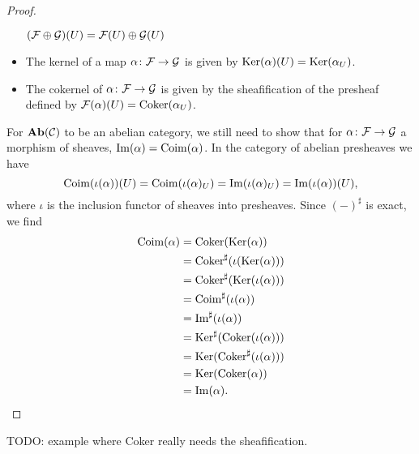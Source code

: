 \documentclass{article}
\begin{document}
\begin{proof}
\begin{itemize}
              $(\mathcal{F} \oplus \mathcal{G} )(U) = \mathcal{F}(U) \oplus \mathcal{G}(U)$
        \item The kernel of a map $\alpha \colon \mathcal{F} \to \mathcal{G}$ is given by
              $\operatorname{Ker}(\alpha)(U) = \operatorname{Ker}(\alpha_U)$.
        \item The cokernel of $\alpha \colon \mathcal{F} \to \mathcal{G}$
              is given by the sheafification of the presheaf defined by
              $\mathcal{F}(\alpha)(U) = \operatorname{Coker}(\alpha_U)$.
    \end{itemize}
    For $\operatorname{\mathbf{Ab}}(\mathcal{C})$ to be an abelian category, we still need to
    show that for $\alpha \colon \mathcal{F} \to \mathcal{G}$ a morphism of sheaves,
    $\operatorname{Im}(\alpha) = \operatorname{Coim}(\alpha)$. In the category of abelian presheaves we have
    \begin{equation*}
        \operatorname{Coim}(\iota(\alpha))(U) = \operatorname{Coim}(\iota(\alpha)_U)
        = \operatorname{Im}(\iota(\alpha)_U) = \operatorname{Im}(\iota(\alpha))(U),
    \end{equation*}
    where $\iota$ is the inclusion functor of sheaves into presheaves.
    Since $(-)^\sharp$ is exact, we find
    \begin{align*}
        \operatorname{Coim}(\alpha)
         & = \operatorname{Coker}(\operatorname{Ker}(\alpha))               \\
         & = \operatorname{Coker}^\sharp(\iota(\operatorname{Ker}(\alpha))) \\
         & = \operatorname{Coker}^\sharp(\operatorname{Ker}(\iota(\alpha))) \\
         & = \operatorname{Coim}^\sharp(\iota(\alpha))       \\
         & = \operatorname{Im}^\sharp(\iota(\alpha))         \\
         & = \operatorname{Ker}^\sharp(\operatorname{Coker}(\iota(\alpha))) \\
         & = \operatorname{Ker}(\operatorname{Coker}^\sharp(\iota(\alpha))) \\
         & = \operatorname{Ker}(\operatorname{Coker}(\alpha))               \\
         & = \operatorname{Im}(\alpha).
    \end{align*}
\end{proof}
TODO: example where Coker really needs the sheafification.
\end{document}
